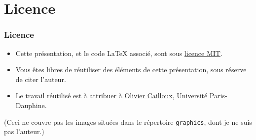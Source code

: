 \documentclass[english, french]{beamer}
\begin{document}
\section{Licence}
\begin{frame}
	\frametitle{Licence}
	\begin{itemize}
		\item Cette présentation, et le code LaTeX associé, sont sous \href{http://opensource.org/licenses/MIT}{licence MIT}.
		\item Vous êtes libres de réutiliser des éléments de cette présentation, sous réserve de citer l’auteur.
		\item Le travail réutilisé est à attribuer à \href{http://www.lamsade.dauphine.fr/~ocailloux/}{Olivier Cailloux}, Université Paris-Dauphine.
	\end{itemize}
	\small{(Ceci ne couvre pas les images situées dans le répertoire \texttt{graphics}, dont je ne suis pas l’auteur.)}
\end{frame}
\end{document}
